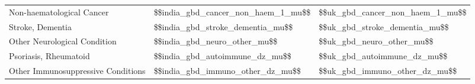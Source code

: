 \begin{tabular}{p{7cm}p{1.1cm}p{1cm}}
Non-haematological Cancer & \num{$$india_gbd_cancer_non_haem_1_mu$$} & \num{$$uk_gbd_cancer_non_haem_1_mu$$} \\[0.25ex]
Stroke, Dementia & \num{$$india_gbd_stroke_dementia_mu$$} & \num{$$uk_gbd_stroke_dementia_mu$$} \\[0.25ex]
Other Neurological Condition & \num{$$india_gbd_neuro_other_mu$$} & \num{$$uk_gbd_neuro_other_mu$$} \\[0.25ex]
Psoriasis, Rheumatoid & \num{$$india_gbd_autoimmune_dz_mu$$} & \num{$$uk_gbd_autoimmune_dz_mu$$} \\[0.25ex]
Other Immunosuppressive Conditions & \num{$$india_gbd_immuno_other_dz_mu$$} & \num{$$uk_gbd_immuno_other_dz_mu$$} \\[0.25ex]
\end{tabular}
